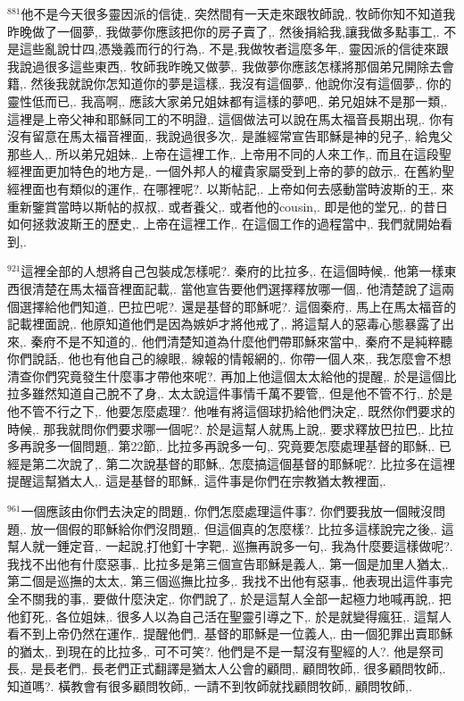 \documentclass{book}
\begin{document}
$^{881}$他不是今天很多靈因派的信徒,.
突然間有一天走來跟牧師說,.
牧師你知不知道我昨晚做了一個夢,.
我做夢你應該把你的房子賣了,.
然後捐給我,讓我做多點事工,.
不是這些亂說廿四,憑幾義而行的行為,.
不是,我做牧者這麼多年,.
靈因派的信徒來跟我說過很多這些東西,.
牧師我昨晚又做夢,.
我做夢你應該怎樣將那個弟兄開除去會籍,.
然後我就說你怎知道你的夢是這樣,.
我沒有這個夢,.
他說你沒有這個夢,.
你的靈性低而已,.
我高啊,.
應該大家弟兄姐妹都有這樣的夢吧,.
弟兄姐妹不是那一類,.
這裡是上帝父神和耶穌同工的不明證,.
這個做法可以說在馬太福音長期出現,.
你有沒有留意在馬太福音裡面,.
我說過很多次,.
是誰經常宣告耶穌是神的兒子,.
給鬼父那些人,.
所以弟兄姐妹,.
上帝在這裡工作,.
上帝用不同的人來工作,.
而且在這段聖經裡面更加特色的地方是,.
一個外邦人的權貴家屬受到上帝的夢的啟示,.
在舊約聖經裡面也有類似的運作,.
在哪裡呢?.
以斯帖記,.
上帝如何去感動當時波斯的王,.
來重新鑒賞當時以斯帖的叔叔,.
或者養父,.
或者他的cousin,.
即是他的堂兄,.
的昔日如何拯救波斯王的歷史,.
上帝在這裡工作,.
在這個工作的過程當中,.
我們就開始看到,.

$^{921}$這裡全部的人想將自己包裝成怎樣呢?.
秦府的比拉多,.
在這個時候,.
他第一樣東西很清楚在馬太福音裡面記載,.
當他宣告要他們選擇釋放哪一個,.
他清楚說了這兩個選擇給他們知道,.
巴拉巴呢?.
還是基督的耶穌呢?.
這個秦府,.
馬上在馬太福音的記載裡面說,.
他原知道他們是因為嫉妒才將他戒了,.
將這幫人的惡毒心態暴露了出來,.
秦府不是不知道的,.
他們清楚知道為什麼他們帶耶穌來當中,.
秦府不是純粹聽你們說話,.
他也有他自己的線眼,.
線報的情報網的,.
你帶一個人來,.
我怎麼會不想清查你們究竟發生什麼事才帶他來呢?.
再加上他這個太太給他的提醒,.
於是這個比拉多雖然知道自己脫不了身,.
太太說這件事情千萬不要管,.
但是他不管不行,.
於是他不管不行之下,.
他要怎麼處理?.
他唯有將這個球扔給他們決定,.
既然你們要求的時候,.
那我就問你們要求哪一個呢?.
於是這幫人就馬上說,.
要求釋放巴拉巴,.
比拉多再說多一個問題,.
第22節,.
比拉多再說多一句,.
究竟要怎麼處理基督的耶穌,.
已經是第二次說了,.
第二次說基督的耶穌,.
怎麼搞這個基督的耶穌呢?.
比拉多在這裡提醒這幫猶太人,.
這是基督的耶穌,.
這件事是你們在宗教猶太教裡面,.

$^{961}$一個應該由你們去決定的問題,.
你們怎麼處理這件事?.
你們要我放一個賊沒問題,.
放一個假的耶穌給你們沒問題,.
但這個真的怎麼樣?.
比拉多這樣說完之後,.
這幫人就一錘定音,.
一起說,打他釘十字靶,.
巡撫再說多一句,.
我為什麼要這樣做呢?.
我找不出他有什麼惡事,.
比拉多是第三個宣告耶穌是義人,.
第一個是加里人猶太,.
第二個是巡撫的太太,.
第三個巡撫比拉多,.
我找不出他有惡事,.
他表現出這件事完全不關我的事,.
要做什麼決定,.
你們說了,.
於是這幫人全部一起極力地喊再說,.
把他釘死,.
各位姐妹,.
很多人以為自己活在聖靈引導之下,.
於是就變得瘋狂,.
這幫人看不到上帝仍然在運作,.
提醒他們,.
基督的耶穌是一位義人,.
由一個犯罪出賣耶穌的猶太,.
到現在的比拉多,.
可不可笑?.
他們是不是一幫沒有聖經的人?.
他是祭司長,.
是長老們,.
長老們正式翻譯是猶太人公會的顧問,.
顧問牧師,.
很多顧問牧師,.
知道嗎?.
橫教會有很多顧問牧師,.
一請不到牧師就找顧問牧師,.
顧問牧師,.
\end{document}

